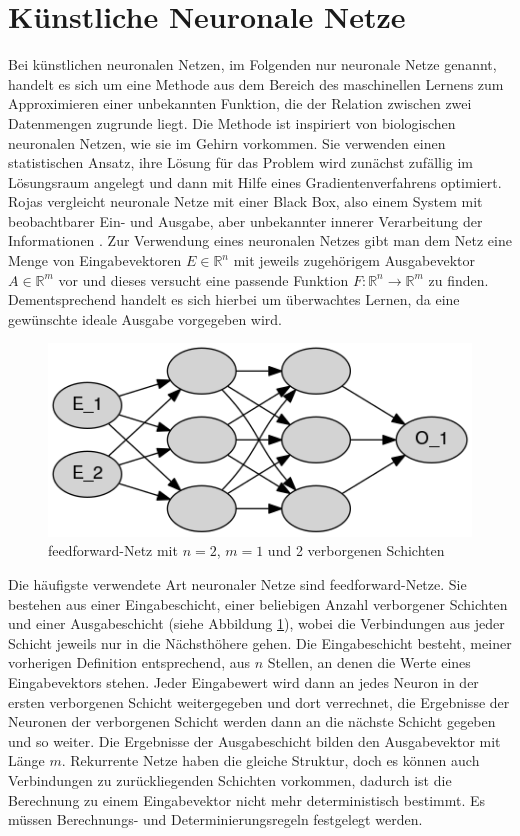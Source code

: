 \documentclass[
	12pt,
	a4paper,
	BCOR10mm,
	DIV14,
	listof=totoc,
	bibliography=totoc,
	headsepline
]{scrreprt}
\begin{document}
\section{Künstliche Neuronale Netze}
\label{back_nn}
Bei künstlichen neuronalen Netzen, im Folgenden nur neuronale Netze genannt, handelt es sich um eine Methode aus dem Bereich des maschinellen Lernens zum Approximieren einer unbekannten Funktion, die der Relation zwischen zwei Datenmengen zugrunde liegt. Die Methode ist inspiriert von biologischen neuronalen Netzen, wie sie im Gehirn vorkommen. 
Sie verwenden einen statistischen Ansatz, ihre Lösung für das Problem wird zunächst zufällig im Lösungsraum angelegt und dann mit Hilfe eines Gradientenverfahrens optimiert.
Rojas vergleicht neuronale Netze mit einer Black Box, also einem System mit beobachtbarer Ein- und Ausgabe, aber unbekannter innerer Verarbeitung der Informationen \cite{Rojas:1996:NNS:235222}. 
Zur Verwendung eines neuronalen Netzes gibt man dem Netz eine Menge von Eingabevektoren $E \in \mathbb{R}^n$ mit jeweils zugehörigem Ausgabevektor $A \in \mathbb{R}^m$ vor und dieses versucht eine passende Funktion $F: \mathbb{R}^n \rightarrow \mathbb{R}^m$ zu finden. Dementsprechend handelt es sich hierbei um überwachtes Lernen, da eine gewünschte ideale Ausgabe vorgegeben wird.

\begin{figure}[h]
	\begin{center}
		\includegraphics[height=.20\textwidth]{Dot/netz.png}
	\end{center}
	\caption{feedforward-Netz mit $n=2$, $m=1$ und 2 verborgenen Schichten}
	\label{fig:Schichten}
\end{figure}

Die häufigste verwendete Art neuronaler Netze sind feedforward-Netze. Sie bestehen aus einer Eingabeschicht, einer beliebigen Anzahl verborgener Schichten und einer Ausgabeschicht (siehe Abbildung \ref{fig:Schichten}), wobei die Verbindungen aus jeder Schicht jeweils nur in die Nächsthöhere gehen. 
Die Eingabeschicht besteht, meiner vorherigen Definition entsprechend, aus $n$ Stellen, an denen die Werte eines Eingabevektors stehen. Jeder Eingabewert wird dann an jedes Neuron in der ersten verborgenen Schicht weitergegeben und dort verrechnet, die Ergebnisse der Neuronen der verborgenen Schicht werden dann an die nächste Schicht gegeben und so weiter.
Die Ergebnisse der Ausgabeschicht bilden den Ausgabevektor mit Länge $m$.
Rekurrente Netze haben die gleiche Struktur, doch es können auch Verbindungen zu zurückliegenden Schichten vorkommen, dadurch ist die Berechnung zu einem Eingabevektor nicht mehr deterministisch bestimmt. Es müssen Berechnungs- und Determinierungsregeln festgelegt werden. 
\end{document}
